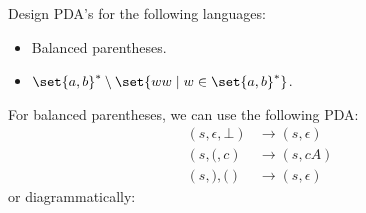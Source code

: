 \begin{exercise}
    Design PDA's for the following languages:
    \begin{itemize}
        \item Balanced parentheses.
        \item $\set{a, b}^* \setminus \set{ww \mid w \in \set{a, b}^*}$.
    \end{itemize}
\end{exercise}
\begin{solution}
    For balanced parentheses, we can use the following PDA:
    \begin{align*}
        (s, \epsilon, \bot) &\to (s, \epsilon) \\
        (s, \texttt{(}, c) &\to (s, c A) \\
        (s, \texttt{)}, \texttt{(}) &\to (s, \epsilon)
    \end{align*}
    or diagrammatically:
    \begin{center}
    \end{center}
\end{solution}
